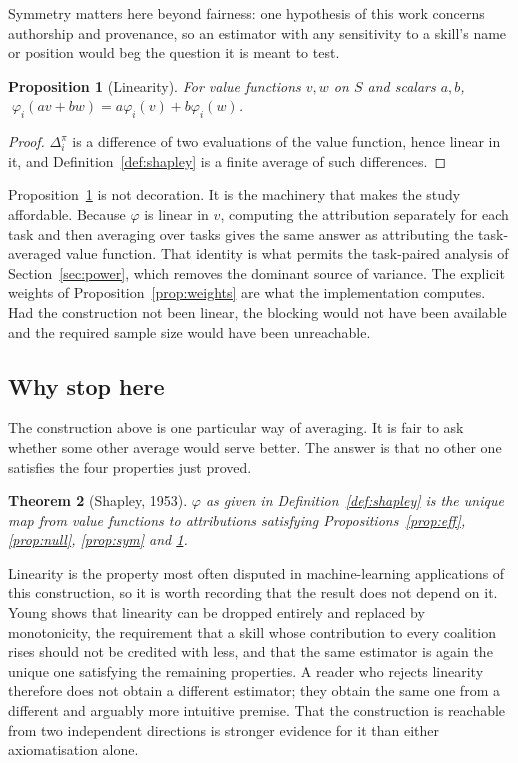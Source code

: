 \documentclass[11pt]{article}
\theoremstyle{plain}
\newtheorem{theorem}{Theorem}
\newtheorem{proposition}[theorem]{Proposition}
\theoremstyle{definition}
\theoremstyle{remark}
\begin{document}
Symmetry matters here beyond fairness: one hypothesis of this work concerns authorship and provenance, so an estimator with any sensitivity to a skill's name or position would beg the question it is meant to test.

\begin{proposition}[Linearity]\label{prop:lin}
For value functions $v, w$ on $S$ and scalars $a,b$, $\;\varphi_i(av + bw) = a\varphi_i(v) + b\varphi_i(w)$.
\end{proposition}

\begin{proof}
$\Delta_i^\pi$ is a difference of two evaluations of the value function, hence linear in it, and Definition~\ref{def:shapley} is a finite average of such differences.
\end{proof}

Proposition~\ref{prop:lin} is not decoration. It is the machinery that makes the study affordable. Because $\varphi$ is linear in $v$, computing the attribution separately for each task and then averaging over tasks gives the same answer as attributing the task-averaged value function. That identity is what permits the task-paired analysis of Section~\ref{sec:power}, which removes the dominant source of variance. The explicit weights of Proposition~\ref{prop:weights} are what the implementation computes. Had the construction not been linear, the blocking would not have been available and the required sample size would have been unreachable.

\subsection{Why stop here}

The construction above is one particular way of averaging. It is fair to ask whether some other average would serve better. The answer is that no other one satisfies the four properties just proved.

\begin{theorem}[Shapley, 1953]\label{thm:shapley}
$\varphi$ as given in Definition~\ref{def:shapley} is the unique map from value functions to attributions satisfying Propositions~\ref{prop:eff}, \ref{prop:null}, \ref{prop:sym} and \ref{prop:lin}.
\end{theorem}

Linearity is the property most often disputed in machine-learning applications of this construction, so it is worth recording that the result does not depend on it. Young \cite{young} shows that linearity can be dropped entirely and replaced by monotonicity, the requirement that a skill whose contribution to every coalition rises should not be credited with less, and that the same estimator is again the unique one satisfying the remaining properties. A reader who rejects linearity therefore does not obtain a different estimator; they obtain the same one from a different and arguably more intuitive premise. That the construction is reachable from two independent directions is stronger evidence for it than either axiomatisation alone.
\end{document}

